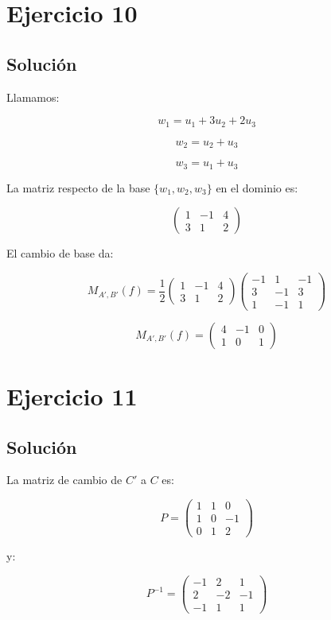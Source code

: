 \documentclass[11pt,a4paper]{article}
\begin{document}
\section{Ejercicio 10}
	\subsection{Solución}

	Llamamos:

	\[
	w_1=u_1+3u_2+2u_3
	\]

	\[
	w_2=u_2+u_3
	\]

	\[
	w_3=u_1+u_3
	\]

	La matriz respecto de la base $\{w_1,w_2,w_3\}$ en el dominio es:

	\[
	\begin{pmatrix}
	1&-1&4\\
	3&1&2
	\end{pmatrix}
	\]

	El cambio de base da:

	\[
	M_{A',B'}(f)
	=
	\frac12
	\begin{pmatrix}
	1&-1&4\\
	3&1&2
	\end{pmatrix}
	\begin{pmatrix}
	-1&1&-1\\
	3&-1&3\\
	1&-1&1
	\end{pmatrix}
	\]

	\[
	\boxed{
	M_{A',B'}(f)
	=
	\begin{pmatrix}
	4&-1&0\\
	1&0&1
	\end{pmatrix}
	}
	\]

\section{Ejercicio 11}
	\subsection{Solución}

	La matriz de cambio de $C'$ a $C$ es:

	\[
	P=
	\begin{pmatrix}
	1&1&0\\
	1&0&-1\\
	0&1&2
	\end{pmatrix}
	\]

	y:

	\[
	P^{-1}
	=
	\begin{pmatrix}
	-1&2&1\\
	2&-2&-1\\
	-1&1&1
	\end{pmatrix}
	\]
\end{document}
